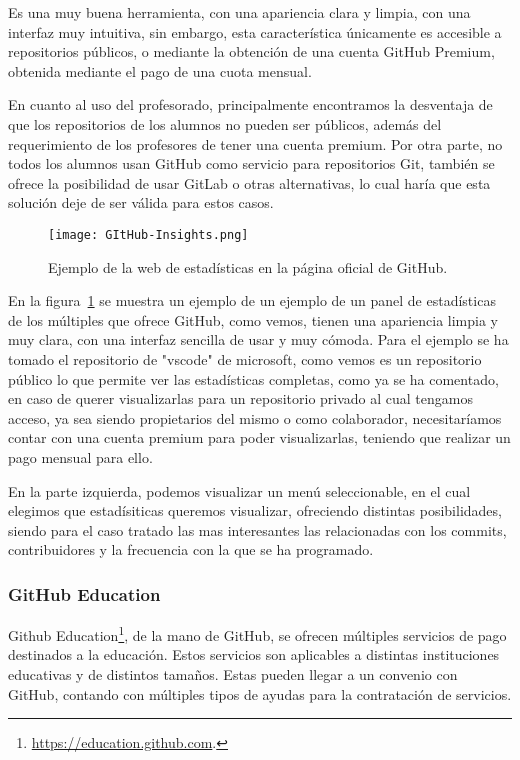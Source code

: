 Es una muy buena herramienta, con una apariencia clara y limpia, con una
interfaz muy intuitiva, sin embargo, esta característica únicamente es
accesible a repositorios públicos, o mediante la obtención de una cuenta
GitHub Premium, obtenida mediante el pago de una cuota mensual.

En cuanto al uso del profesorado, principalmente encontramos la desventaja
de que los repositorios de los alumnos no pueden ser públicos, además del
requerimiento de los profesores de tener una cuenta premium. Por otra
parte, no todos los alumnos usan GitHub como servicio para repositorios
Git, también se ofrece la posibilidad de usar GitLab o otras alternativas,
lo cual haría que esta solución deje de ser válida para estos casos.



\begin{figure}[h!]
  \texttt{[image: GItHub-Insights.png]}
  \caption{Ejemplo de la web de estadísticas en la página oficial de
    GitHub.}
  \label{figure:GithubInsights}
\end{figure}

En la figura~\ref{figure:GithubInsights} se muestra un ejemplo de un
ejemplo de un panel de estadísticas de los múltiples que ofrece GitHub,
como vemos, tienen una apariencia limpia y muy clara, con una interfaz
sencilla de usar y muy cómoda. Para el ejemplo se ha tomado el repositorio
de "vscode" de microsoft, como vemos es un repositorio público lo que
permite ver las estadísticas completas, como ya se ha comentado, en caso de
querer visualizarlas para un repositorio privado al cual tengamos acceso,
ya sea siendo propietarios del mismo o como colaborador, necesitaríamos
contar con una cuenta premium para poder visualizarlas, teniendo que
realizar un pago mensual para ello.

En la parte izquierda, podemos visualizar un menú seleccionable, en el cual
elegimos que estadísiticas queremos visualizar, ofreciendo distintas
posibilidades, siendo para el caso tratado las mas interesantes las
relacionadas con los commits, contribuidores y la frecuencia con la que se
ha programado.

\subsubsection{GitHub Education}

Github Education\footnote{\url{https://education.github.com}.}, de la mano
de GitHub, se ofrecen múltiples servicios de pago destinados a la
educación. Estos servicios son aplicables a distintas instituciones
educativas y de distintos tamaños. Estas pueden llegar a un convenio con
GitHub, contando con múltiples tipos de ayudas para la contratación de
servicios.


